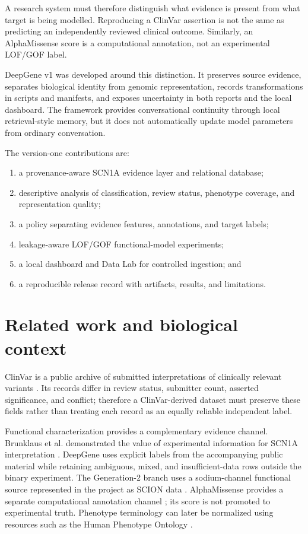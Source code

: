 \documentclass[12pt,a4paper]{article}
\begin{document}
A research system must therefore distinguish what evidence is present from what target is being modelled. Reproducing a ClinVar assertion is not the same as predicting an independently reviewed clinical outcome. Similarly, an AlphaMissense score is a computational annotation, not an experimental LOF/GOF label.

DeepGene v1 was developed around this distinction. It preserves source evidence, separates biological identity from genomic representation, records transformations in scripts and manifests, and exposes uncertainty in both reports and the local dashboard. The framework provides conversational continuity through local retrieval-style memory, but it does not automatically update model parameters from ordinary conversation.

The version-one contributions are:
\begin{enumerate}
\item a provenance-aware SCN1A evidence layer and relational database;
\item descriptive analysis of classification, review status, phenotype coverage, and representation quality;
\item a policy separating evidence features, annotations, and target labels;
\item leakage-aware LOF/GOF functional-model experiments;
\item a local dashboard and Data Lab for controlled ingestion; and
\item a reproducible release record with artifacts, results, and limitations.
\end{enumerate}

\section{Related work and biological context}
ClinVar is a public archive of submitted interpretations of clinically relevant variants \cite{clinvar}. Its records differ in review status, submitter count, asserted significance, and conflict; therefore a ClinVar-derived dataset must preserve these fields rather than treating each record as an equally reliable independent label.

Functional characterization provides a complementary evidence channel. Brunklaus et al. demonstrated the value of experimental information for SCN1A interpretation \cite{brunklaus}. DeepGene uses explicit labels from the accompanying public material while retaining ambiguous, mixed, and insufficient-data rows outside the binary experiment. The Generation-2 branch uses a sodium-channel functional source represented in the project as SCION data \cite{scion}. AlphaMissense provides a separate computational annotation channel \cite{alphamissense}; its score is not promoted to experimental truth. Phenotype terminology can later be normalized using resources such as the Human Phenotype Ontology \cite{hpo}.
\end{document}
